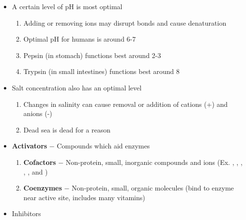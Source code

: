 \documentclass[12pt]{article}
\begin{document}
\begin{itemize}
\begin{enumerate}
    \end{enumerate}    

  \item A certain level of pH is most optimal

    \begin{enumerate}

      \item Adding or removing  ions may disrupt bonds and cause denaturation

      \item Optimal pH for humans is around 6-7

      \item Pepsin (in stomach) functions best around 2-3

      \item Trypsin (in small intestines) functions best around 8 

    \end{enumerate}

  \item Salt concentration also has an optimal level

    \begin{enumerate}

      \item Changes in salinity can cause removal or addition of cations (+) and anions (-)

      \item Dead sea is dead for a reason

    \end{enumerate}

  \item \textbf{Activators} $-$ Compounds which aid enzymes

    \begin{enumerate}

      \item \textbf{Cofactors} $-$ Non-protein, small, inorganic compounds and ions (Ex. , , , , , and )

      \item \textbf{Coenzymes} $-$ Non-protein, small, organic molecules  (bind to enzyme near active site, includes many vitamins)

    \end{enumerate}

  \item Inhibitors

    \begin{enumerate}


\end{enumerate}
\end{itemize}
\end{document}
